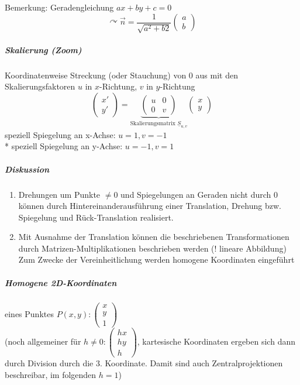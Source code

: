 \documentclass[a4paper]{scrartcl}
\begin{document}
Bemerkung: Geradengleichung $ax + by + c = 0$
\[\curvearrowright \vec{n} = \frac{1}{\sqrt{a^2 + b2}} \begin{pmatrix} a \\ b \end{pmatrix}\]

\subparagraph{Skalierung (Zoom)} Koordinatenweise Streckung (oder Stauchung) von $0$ aus mit den Skalierungsfaktoren $u$ in $x$-Richtung, $v$ in $y$-Richtung
\[ \begin{pmatrix} x' \\ y' \end{pmatrix} = \underbrace{\begin{pmatrix} u & 0 \\ 0 & v \end{pmatrix}}_{\text{Skalierungsmatrix } \underline{S}_{u,v}} \begin{pmatrix} x \\ y \end{pmatrix} \]
speziell Spiegelung an x-Achse: $u=1, v=-1$\\*
speziell Spiegelung an y-Achse: $u=-1, v=1$\\

\subparagraph{Diskussion}
\begin{enumerate}
\item Drehungen um Punkte $\neq 0$ und Spiegelungen an Geraden nicht durch $0$ können durch Hintereinanderausführung einer Translation, Drehung bzw. Spiegelung und Rück-Translation realisiert.
\item Mit Ausnahme der Translation können die beschriebenen Transformationen durch Matrizen-Multiplikationen beschrieben werden (! lineare Abbildung) Zum Zwecke der Vereinheitlichung werden homogene Koordinaten eingeführt
\end{enumerate}

\subparagraph{Homogene 2D-Koordinaten} eines Punktes $P(x,y) : \begin{pmatrix} x \\ y \\1\end{pmatrix}$\\
(noch allgemeiner für $h \neq 0: \begin{pmatrix} hx\\hy\\h\end{pmatrix}$, kartesische Koordinaten ergeben sich dann durch Division durch die 3. Koordinate. Damit sind auch Zentralprojektionen beschreibar, im folgenden $h=1$)
\end{document}
